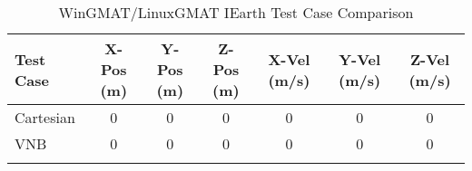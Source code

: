 \begin{table}[htbp!]
\centering
\caption{ WinGMAT/LinuxGMAT IEarth Test Case Comparison}
      \begin{tabular}{lcccccc}
      \hline\hline
          Test Case & X-Pos (m) & Y-Pos (m) & Z-Pos (m) & X-Vel (m/s) & Y-Vel (m/s) & Z-Vel (m/s) \\
         \hline
         Cartesian & 0 & 0 & 0 & 0 & 0 & 0 \\
         VNB & 0 & 0 & 0 & 0 & 0 & 0 \\
      \hline\hline
      \label{Table: IEarth WinGMAT-LinuxGMAT Table} 
\end{tabular}
\end{table}
